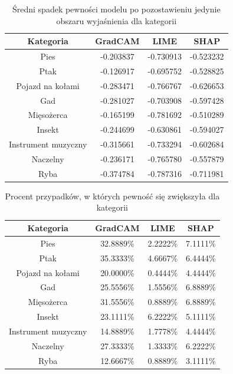 \begin{table}
	\centering
	\begin{tabular}{|c|c|c|c|}
		\hline
		\textbf{Kategoria}  & \textbf{GradCAM} & \textbf{LIME} & \textbf{SHAP} \\
		\hline
		Pies                & -0.203837        & -0.730913     & -0.523232     \\
		\hline
		Ptak                & -0.126917        & -0.695752     & -0.528825     \\
		\hline
		Pojazd na kołami    & -0.283471        & -0.766767     & -0.626653     \\
		\hline
		Gad                 & -0.281027        & -0.703908     & -0.597428     \\
		\hline
		Mięsożerca          & -0.165199        & -0.781692     & -0.510289     \\
		\hline
		Insekt              & -0.244699        & -0.630861     & -0.594027     \\
		\hline
		Instrument muzyczny & -0.315661        & -0.733294     & -0.602684     \\
		\hline
		Naczelny            & -0.236171        & -0.765780     & -0.557879     \\
		\hline
		Ryba                & -0.374784        & -0.787316     & -0.711981     \\
		\hline
	\end{tabular}
	\caption{Średni spadek pewności modelu po pozostawieniu jedynie obszaru wyjaśnienia dla kategorii}
	\label{tab:category_confidence_exp}
\end{table}

\begin{table}
	\centering
	\begin{tabular}{|c|c|c|c|}
		\hline
		\textbf{Kategoria}  & \textbf{GradCAM} & \textbf{LIME} & \textbf{SHAP} \\
		\hline
		Pies                & 32.8889\%        & 2.2222\%      & 7.1111\%      \\
		\hline
		Ptak                & 35.3333\%        & 4.6667\%      & 6.4444\%      \\
		\hline
		Pojazd na kołami    & 20.0000\%        & 0.4444\%      & 4.4444\%      \\
		\hline
		Gad                 & 25.5556\%        & 1.5556\%      & 6.8889\%      \\
		\hline
		Mięsożerca          & 31.5556\%        & 0.8889\%      & 6.8889\%      \\
		\hline
		Insekt              & 23.1111\%        & 6.2222\%      & 5.1111\%      \\
		\hline
		Instrument muzyczny & 14.8889\%        & 1.7778\%      & 4.4444\%      \\
		\hline
		Naczelny            & 27.3333\%        & 1.3333\%      & 6.2222\%      \\
		\hline
		Ryba                & 12.6667\%        & 0.8889\%      & 3.1111\%      \\
		\hline
	\end{tabular}
	\caption{Procent przypadków, w których pewność się zwiększyła dla kategorii}
	\label{tab:category_confidence_exp_percent}
\end{table}

